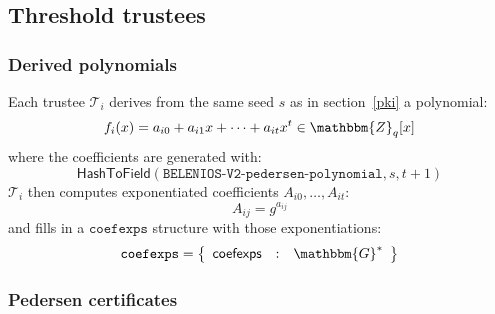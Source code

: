 \documentclass[a4paper]{article}
\newcommand{\dstprefix}{BELENIOS-V2}
\newcommand{\G}{\mathbbm{G}}
\newcommand{\Z}{\mathbbm{Z}}
\begin{document}
\subsection{Threshold trustees}
\label{threshold}

\subsubsection{Derived polynomials}
\label{derived-polynomials}

Each trustee $\mathcal{T}_i$ derives from the same seed $s$ as in
section~\ref{pki} a polynomial:
\[
  f_i(x)=a_{i0}+a_{i1}x+\dotsb+a_{it}x^t\in\Z_q[x]
\]
where the coefficients are generated with:
\[
  \textsf{HashToField}(\texttt{\dstprefix-pedersen-polynomial},s,t+1)
\]
$\mathcal{T}_i$ then computes exponentiated coefficients
$A_{i0},\dots,A_{it}$:
\[
  A_{ij}=g^{a_{ij}}
\]
and fills in a $\texttt{coefexps}$ structure with those
exponentiations:
\begin{gather*}
  \texttt{coefexps}=\left\{
    \begin{array}{rcl}
      \textsf{coefexps}&:&\G^\ast
    \end{array}
  \right\}
\end{gather*}

\subsubsection{Pedersen certificates}
\end{document}
